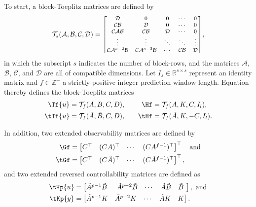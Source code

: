 \documentclass[twocolumn]{autart}    %
\begin{document}
To start, a block-Toeplitz matrices are defined by
\begin{align}\label{eqn:blockToeplitz} 
\mathcal{T}_s(\mathcal{A},\mathcal{B},\mathcal{C},\mathcal{D}) =\scriptsize{
	\begin{bmatrix}
		\mathcal{D}         & 0         & 0      & \cdots  & 0\\
		\mathcal{C}\mathcal{B}        & \mathcal{D}         & 0      & \cdots  & 0\\
		\mathcal{C}\mathcal{A}\mathcal{B}       & \mathcal{C}\mathcal{B}        & \mathcal{D}      & \cdots & 0\\
		\vdots    &  \vdots & \ddots & \ddots & \vdots\\
		\mathcal{C}\mathcal{A}^{s-2}\mathcal{B} & \mathcal{C}\mathcal{A}^{s-3}\mathcal{B} & \cdots  & \mathcal{C}\mathcal{B}     & \mathcal{D}
	\end{bmatrix}},
\end{align}
in which the subscript $s$ indicates the number of block-rows, and the matrices $\mathcal{A}$, $\mathcal{B}$, $\mathcal{C}$, and $\mathcal{D}$ are all of compatible dimensions. Let $I_s\in\mathbb{R}^{s\times s}$ represent an identity matrix and $f\in\mathbb{Z}^+$ a strictly-positive integer prediction window length. Equation~ thereby defines the block-Toeplitz matrices
\begin{alignat*}{2}
\Tf{u}&=\mathcal{T}_f(A,B,C,D),\quad  &\Hf&=\mathcal{T}_f(A,K,C,I_l),\\
\tTf{u}&=\mathcal{T}_f(\tilde{A},\tilde{B},C,D),\quad  &\tHf&=\mathcal{T}_f(\tilde{A},K,-C,I_l).
\end{alignat*}

In addition, two extended observability matrices are defined by
\begin{align*}
\Gf &= \begin{bmatrix}C^\top & (CA)^\top & \cdots & (CA^{f-1})^\top\end{bmatrix}^\top\quad\text{and}\\
\tGf &= \begin{bmatrix}C^\top & (C\tilde{A})^\top & \cdots & (C\tilde{A}^{f-1})^\top\end{bmatrix}^\top,
\end{align*}
and two extended reversed controllability matrices are defined as 
\begin{align*}
\tKp{u} &= \begin{bmatrix} \tilde{A}^{p-1}\tilde{B}\:\, & \tilde{A}^{p-2}\tilde{B} & \cdots & \tilde{A}\tilde{B} & \tilde{B}\:\, \end{bmatrix},\text{ and}\\
\tKp{y} &= \begin{bmatrix} \tilde{A}^{p-1}K & \tilde{A}^{p-2}K & \cdots & \tilde{A}K & K \end{bmatrix}.
\end{align*}
\end{document}
